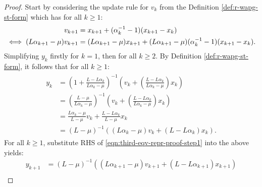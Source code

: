 \documentclass[12pt]{article}
\begin{document}
        \begin{proof}
            Start by considering the update rule for $v_k$ from the Definition \ref{def:r-wapg-st-form} which has for all $k \ge 1$:
            \begin{align}
                v_{k + 1} &=
                x_{k + 1} + (\alpha_k^{-1} - 1)(x_{k + 1} - x_k)
                \notag
                \\
                \iff
                (L \alpha_{k + 1} - \mu)v_{k + 1}
                &=
                (L \alpha_{k + 1} - \mu)x_{k + 1} + (L\alpha_{k + 1} - \mu)(\alpha_k^{-1} - 1)(x_{k + 1} - x_k).
                \label{eqn:third-eqv-repr-proof-step1}
            \end{align}
            Simplifying $y_k$ firstly for $k = 1$, then for all $k \ge 2$.
            By Definition \ref{def:r-wapg-st-form}, it follows that for all $k \ge 1$:
            \begin{align}\label{eqn:third-eqv-repr-proof-step2}
                \begin{split}
                    y_k &=
                    \left(
                        1 + \frac{L - L\alpha_k}{L\alpha_k - \mu}
                    \right)^{-1}
                    \left(
                        v_k +
                        \left(\frac{L - L\alpha_k}{L\alpha_k - \mu} \right) x_k
                    \right)
                    \\
                    &=
                    \left(
                    \frac{L - \mu}{L\alpha_k - \mu}
                    \right)^{-1}
                    \left(
                        v_k +
                        \left(\frac{L - L\alpha_k}{L\alpha_k - \mu} \right) x_k
                    \right)
                    \\
                    &=
                    \frac{L\alpha_k - \mu}{L - \mu} v_k
                    +
                    \frac{L - L \alpha_k}{L - \mu} x_k
                    \\
                    &= (L - \mu)^{-1}((L \alpha_k - \mu)v_k + (L - L \alpha_k)x_k).
                \end{split}
            \end{align}
            For all $k\ge 1$, substitute RHS of \eqref{eqn:third-eqv-repr-proof-step1} into the above yields:
            {\small
            \begin{align*}
                y_{k + 1} &=
                (L - \mu)^{-1}((L\alpha_{k + 1} - \mu)v_{k + 1} + (L - L \alpha_{k + 1})x_{k + 1})
                \\

\end{align*}}
\end{proof}
\end{document}
